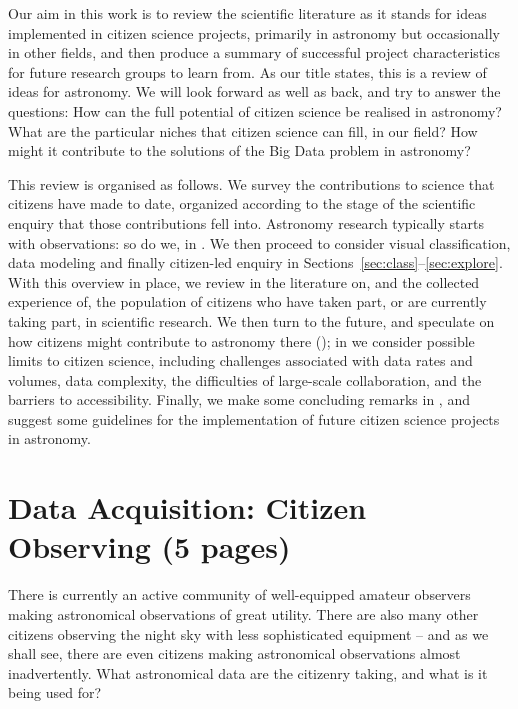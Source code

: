 \documentclass{ar2e}
\begin{document}
Our aim in this work is to review the scientific literature as it stands for
ideas implemented in citizen science projects, primarily in astronomy but
occasionally in other fields, and then produce a summary of successful project
characteristics for future research groups to learn from.  As our title states,
this is a review of ideas for astronomy. We will look forward as well as back,
and try to answer the questions: How can the full potential of citizen science
be realised in astronomy? What are the particular niches that citizen science
can fill, in our field? How might it contribute to the solutions of the Big Data
problem in astronomy?


This review is organised as follows. We survey the contributions to science that
citizens have made to date, organized according to the stage of the scientific
enquiry that those contributions fell into. Astronomy research typically starts
with observations: so do we, in . We then proceed to consider 
visual classification, data modeling and finally citizen-led enquiry in 
Sections~\ref{sec:class}--\ref{sec:explore}. With this overview in place, we
review in  the literature on, and the collected experience of,
the population of citizens who have taken part, or are currently taking part, in
scientific research. We then turn to the future, and speculate on how citizens
might contribute to astronomy there (); in  
we consider possible limits to citizen science, including challenges associated
with data rates and volumes, data complexity, the difficulties of large-scale
collaboration, and the barriers to accessibility. Finally, we make some
concluding remarks in , and suggest some guidelines for
the implementation of future citizen science projects in astronomy.



\section{Data Acquisition: Citizen Observing (5 pages)}
\label{sec:obs}

There is currently an active community of well-equipped amateur observers making
astronomical observations of great utility. There are also many other citizens
observing the night sky with less sophisticated equipment -- and as we shall
see, there are even citizens making  astronomical observations almost
inadvertently. What astronomical data are the citizenry taking, and what is it
being used for?
\end{document}
